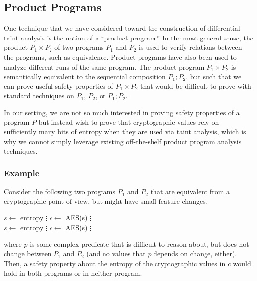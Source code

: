 \documentclass[letterpaper,twocolumn,10pt]{article}
\begin{document}
\subsection{Product Programs}

One technique that we have considered toward the construction of differential taint analysis is the notion of a ``product program.'' In the most general sense, the product $P_1 \times P_2$ of two programs $P_1$ and $P_2$ is used to verify
relations between the programs, such as equivalence. Product programs have also been used to analyze different runs of the same program. 
The product program $P_1 \times P_2$ is semantically equivalent to the sequential composition $P_1; P_2$, but such that we can prove useful safety properties of $P_1 \times P_2$ that would be difficult to prove with standard techniques on $P_1$, $P_2$, or $P_1; P_2$.

In our setting, we are not so much interested in proving safety properties of a program $P$ but instead wish to prove that cryptographic values rely on sufficiently many bits of entropy when they are used via taint analysis, 
which is why we cannot simply leverage existing off-the-shelf product program analysis techniques.

\subsubsection{Example}

Consider the following two programs $P_1$ and $P_2$ that are equivalent from a cryptographic point of view, but might have small feature changes. 

\begin{algorithmic}
\State $s \gets$ entropy
\State $\vdots$
\State $c \gets$ AES(s)
\EndIf
\State $\vdots$
\EndFunction
\\
\State $s \gets$ entropy
\State $\vdots$
\State $c \gets$ AES(s)
\EndIf
\State $\vdots$
\EndFunction
\end{algorithmic}

where $p$ is some complex predicate that is difficult to reason about, but does not change between $P_1$ and $P_2$ (and no values that $p$ depends on change, either). Then, a safety property about the entropy of the cryptographic values in $c$ would hold in both programs or in neither program. 
\end{document}
